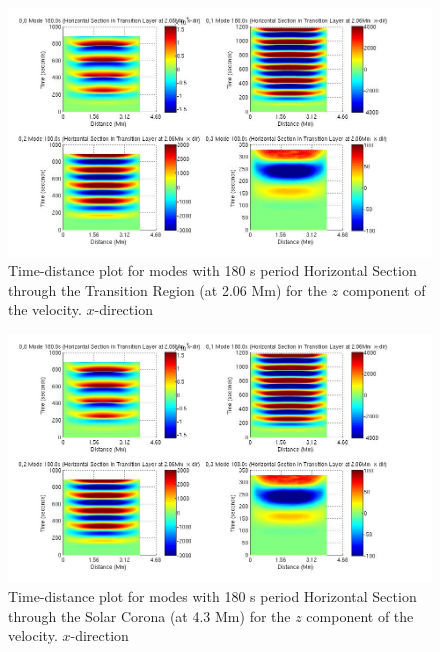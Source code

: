 \documentclass[preprint,authoryear,12pt]{elsarticle}
\begin{document}
\begin{figure}[h]
\includegraphics[scale=0.5]{imagesn/dt_180_horiz_x_2p06Mm.jpg}
\caption{Time-distance plot for modes with 180 s period Horizontal Section through the Transition Region (at 2.06 Mm) for the $z$  component of the velocity. $x$-direction}
\label{Fig15}
\end{figure}

\begin{figure}[h]
\includegraphics[scale=0.5]{imagesn/dt_180_horiz_x_2p06Mm.jpg}
\caption{Time-distance plot for modes with 180 s period Horizontal Section through the Solar Corona (at 4.3 Mm) for the $z$ component of the velocity. $x$-direction}
\label{Fig16}
\end{figure}
\end{document}
